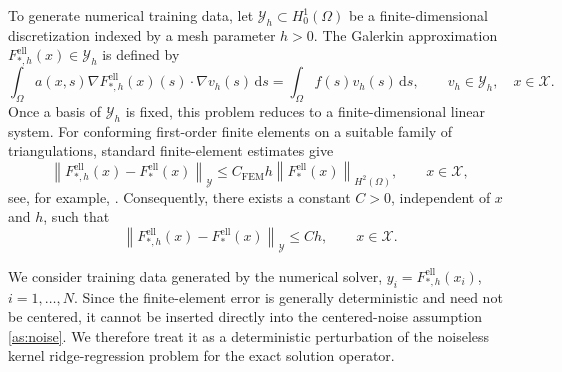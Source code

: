 \documentclass[11pt]{article}
\numberwithin{equation}{section}
\theoremstyle{plain}
\theoremstyle{definition}
\theoremstyle{remark}
\newcommand{\X}{\mathcal{X}}
\newcommand{\Y}{\mathcal{Y}}
\newcommand{\Fell}{F_{*}^{\mathrm{ell}}}
\begin{document}
To generate numerical training data, let
$\Y_h\subset H_0^1(\Omega)$ be a finite-dimensional discretization indexed by
a mesh parameter $h>0$. The Galerkin approximation
$F_{*,h}^{\mathrm{ell}}(x)\in\Y_h$ is defined by
\begin{equation}
\int_\Omega
a(x,s)\nabla F_{*,h}^{\mathrm{ell}}(x)(s)\cdot\nabla v_h(s)\,\mathrm{d}s
=
\int_\Omega f(s)v_h(s)\,\mathrm{d}s,
\qquad
v_h\in\Y_h,\quad x\in\X.
\label{eq:elliptic_discretized}
\end{equation}
Once a basis of $\Y_h$ is fixed, this problem reduces to a finite-dimensional
linear system. For conforming first-order finite elements on a suitable
family of triangulations, standard finite-element estimates give
\begin{equation}
\left\|F_{*,h}^{\mathrm{ell}}(x)-\Fell(x)\right\|_{\Y}
\leq
C_{\mathrm{FEM}}h
\left\|\Fell(x)\right\|_{H^2(\Omega)},
\qquad x\in\X,
\label{eq:fem_bound}
\end{equation}
see, for example, \cite[Theorem~4.6]{quarteroni2009numerical}. Consequently,
there exists a constant $C>0$, independent of $x$ and $h$, such that
\begin{equation}
\left\|F_{*,h}^{\mathrm{ell}}(x)-\Fell(x)\right\|_{\Y}
\leq Ch,
\qquad x\in\X.
\label{eq:fem_uniform_bound}
\end{equation}

We consider training data generated by the numerical solver,
$y_i=F_{*,h}^{\mathrm{ell}}(x_i)$, $i=1,\ldots,N$.
Since the finite-element error is generally deterministic and need not be
centered, it cannot be inserted directly into the centered-noise assumption
\ref{as:noise}. We therefore treat it as a deterministic perturbation of the
noiseless kernel ridge-regression problem for the exact solution operator.
\end{document}

